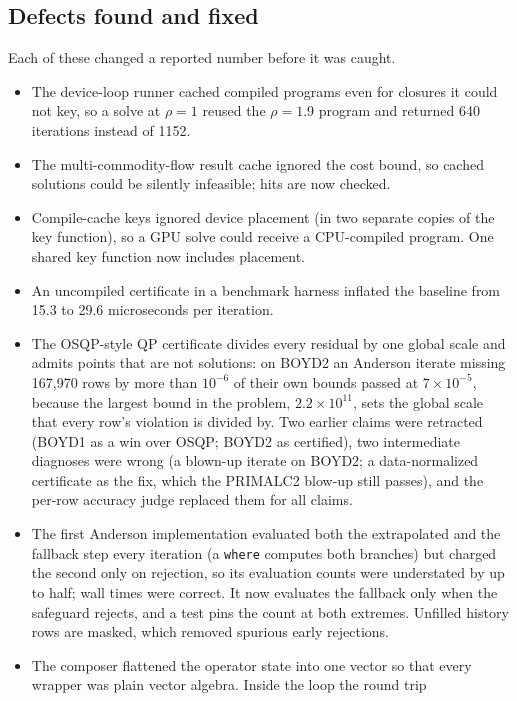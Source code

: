 \subsection{Defects found and fixed}
\label{app:log:defects}

Each of these changed a reported number before it was caught.
\begin{itemize}
\item The device-loop runner cached compiled programs even for closures it
  could not key, so a solve at $\rho=1$ reused the $\rho=1.9$ program and
  returned 640 iterations instead of 1152.
\item The multi-commodity-flow result cache ignored the cost bound, so
  cached solutions could be silently infeasible; hits are now checked.
\item Compile-cache keys ignored device placement (in two separate copies of
  the key function), so a GPU solve could receive a CPU-compiled program. One
  shared key function now includes placement.
\item An uncompiled certificate in a benchmark harness inflated the baseline
  from 15.3 to 29.6 microseconds per iteration.
\item The OSQP-style QP certificate divides every residual by one global scale and
  admits points that are not solutions: on BOYD2 an Anderson iterate missing
  167,970 rows by more than $10^{-6}$ of their own bounds passed at $7\times10^{-5}$,
  because the largest bound in the problem, $2.2\times10^{11}$, sets the global
  scale that every row's violation is divided by. Two earlier claims were retracted (BOYD1 as a win over
  OSQP; BOYD2 as certified), two intermediate diagnoses were wrong (a blown-up
  iterate on BOYD2; a data-normalized certificate as the fix, which the
  PRIMALC2 blow-up still passes), and the per-row accuracy judge replaced
  them for all claims.
\item The first Anderson implementation evaluated both the extrapolated and the
  fallback step every iteration (a \texttt{where} computes both branches) but
  charged the second only on rejection, so its evaluation counts were
  understated by up to half; wall times were correct. It now evaluates the
  fallback only when the safeguard rejects, and a test pins the count at both
  extremes. Unfilled history rows are masked, which removed spurious early
  rejections.
\item The composer flattened the operator state into one vector so that
  every wrapper was plain vector algebra. Inside the loop the round trip

\end{itemize}
